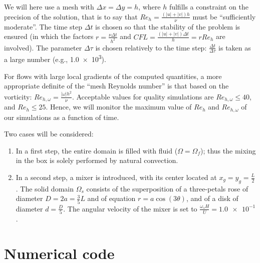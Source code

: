 \documentclass[a4paper,10pt]{scrartcl}
\begin{document}
We will here use a mesh with $\Delta x = \Delta y = h$, where $h$ fulfills a constraint on the precision of the solution, that is to say that $Re_h = \frac{(|u|+|v|)h}{\nu}$ must be ``sufficiently moderate''. The time step $\Delta t$ is chosen so that the stability of the problem is ensured (in which the factors $r = \frac{\nu\Delta t}{h^2}$ and $CFL = \frac{(|u|+|v|)\Delta t}{h} = rRe_h$ are involved). The parameter $\Delta\tau$ is chosen relatively to the time step: $\frac{\Delta t}{\Delta\tau}$ is taken as a large number (e.g., \num{1.0e3}).

For flows with large local gradients of the computed quantities, a more appropriate definite of the ``mesh Reynolds number'' is that based on the vorticity: $Re_{h,\omega} = \frac{|\omega|h^2}{\nu}$. Acceptable values for quality simulations are $Re_{h,\omega} \leq 40$, and $Re_h \leq 25$. Hence, we will monitor the maximum value of $Re_h$ and $Re_{h,\omega}$ of our simulations as a function of time.

Two cases will be considered:
\begin{enumerate}
    \item In a first step, the entire domain is filled with fluid ($\Omega = \Omega_f$); thus the mixing in the box is solely performed by natural convection.
    \item In a second step, a mixer is introduced, with its center located at $x_g = y_g = \frac{L}{2}$. The solid domain $\Omega_s$ consists of the superposition of a three-petals rose of diameter $D = 2a = \frac{3}{5}L$ and of equation $r=a\cos(3\theta)$, and of a disk of diameter $d=\frac{D}{5}$. The angular velocity of the mixer is set to $\frac{\omega_sH}{U} = \num{1.0e-1}$.
\end{enumerate}

\section{Numerical code}
\end{document}
